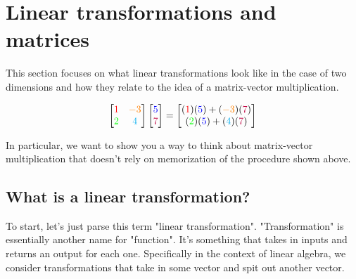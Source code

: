 \section{Linear transformations and matrices}

This section focuses on what linear transformations look like in the case of two
dimensions and how they relate to the idea of a matrix-vector multiplication.

\begin{equation*}
  \begin{bmatrix}
    \textcolor{red}{1} & \textcolor{orange}{-3} \\
    \textcolor{green}{2} & \textcolor{cyan}{4}
  \end{bmatrix}
  \begin{bmatrix}
    \textcolor{blue}{5} \\
    \textcolor{purple}{7}
  \end{bmatrix} = \begin{bmatrix}
    (\textcolor{red}{1})(\textcolor{blue}{5}) +
      (\textcolor{orange}{-3})(\textcolor{purple}{7}) \\
    (\textcolor{green}{2})(\textcolor{blue}{5}) +
      (\textcolor{cyan}{4})(\textcolor{purple}{7})
  \end{bmatrix}
\end{equation*}

In particular, we want to show you a way to think about matrix-vector
multiplication that doesn't rely on memorization of the procedure shown above.

\subsection{What is a linear transformation?}

To start, let's just parse this term "linear transformation". "Transformation"
is essentially another name for "function". It's something that takes in inputs
and returns an output for each one. Specifically in the context of linear
algebra, we consider transformations that take in some vector and spit out
another vector.

\begin{figure}[H]
  \centering

\end{figure}

